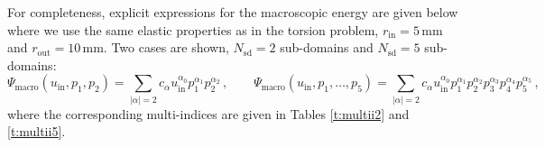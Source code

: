 \documentclass[final,1p,times]{elsarticle}
\newcommand{\be}{\begin{equation}}
\newcommand{\ee}{\end{equation}}
\begin{document}
For completeness, explicit expressions for the macroscopic energy are given below where we use the same elastic properties as in the torsion problem, $r_\mathrm{in}=5 \,\mathrm{mm}$ and $r_\mathrm{out}=10\, \mathrm{mm}$.  Two cases are shown, $N_\mathrm{sd}=2$ sub-domains and  $N_\mathrm{sd}=5$ sub-domains:
\be
\label{eq110a}
\Psi_\mathrm{macro}(u_\mathrm{in},p_1,p_2) 
= \sum_{|\alpha|=2} c_\alpha u_\mathrm{in}^{\alpha_0} p_1^{\alpha_1} p_2^{\alpha_2}\,,
\qquad
\Psi_\mathrm{macro}(u_\mathrm{in},p_1,\ldots,p_5) 
= \sum_{|\alpha|=2} c_\alpha u_\mathrm{in}^{\alpha_0} p_1^{\alpha_1} p_2^{\alpha_2}
p_3^{\alpha_3}p_4^{\alpha_4}p_5^{\alpha_5}
\,,
\ee
where the corresponding multi-indices are given in Tables \ref{t:multii2} and \ref{t:multii5}.
\end{document}
